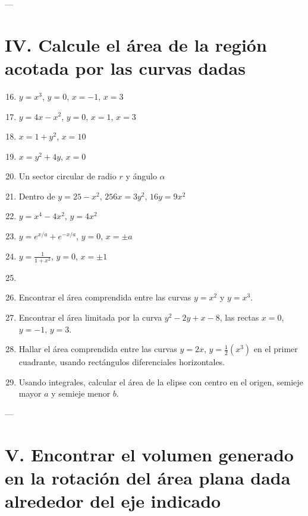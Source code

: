 \documentclass[12pt]{article}
\begin{document}
---

\section*{IV. Calcule el área de la región acotada por las curvas dadas}

\begin{enumerate}
\setcounter{enumi}{15}
\item $y=x^3$, $y=0$, $x=-1$, $x=3$
\item $y=4x-x^2$, $y=0$, $x=1$, $x=3$
\item $x=1+y^2$, $x=10$
\item $x=y^2+4y$, $x=0$
\item Un sector circular de radio $r$ y ángulo $\alpha$
\item Dentro de $y=25-x^2$, $256x=3y^2$, $16y=9x^2$
\item $y=x^4-4x^2$, $y=4x^2$
\item $y=e^{x/a}+e^{-x/a}$, $y=0$, $x=\pm a$
\item $y=\frac{1}{1+x^2}$, $y=0$, $x=\pm1$
\item \item Encontrar el área comprendida entre las curvas $y=x^2$ y $y=x^3$.
\item Encontrar el área limitada por la curva $y^2-2y+x-8$, las rectas $x=0$, $y=-1$, $y=3$.
\item Hallar el área comprendida entre las curvas $y=2x$, $y=\frac{1}{2}(x^3)$ en el primer cuadrante, usando rectángulos diferenciales horizontales.
\item Usando integrales, calcular el área de la elipse con centro en el origen, semieje mayor $a$ y semieje menor $b$.
\end{enumerate}

---

\section*{V. Encontrar el volumen generado en la rotación del área plana dada alrededor del eje indicado}
\end{document}
